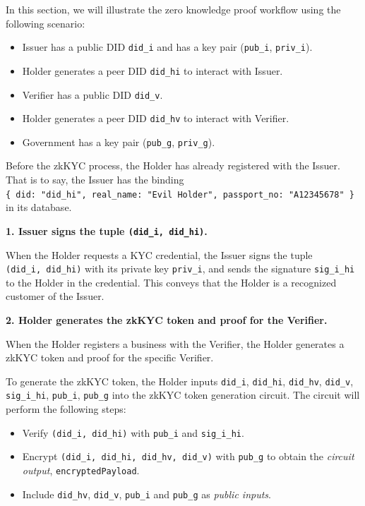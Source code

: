 \documentclass[
]{report}
\providecommand{\tightlist}{%
  \setlength{\itemsep}{0pt}\setlength{\parskip}{0pt}}
\begin{document}
In this section, we will illustrate the zero knowledge proof workflow
using the following scenario:

\begin{itemize}
\tightlist
\item
  Issuer has a public DID \texttt{did\_i} and has a key pair
  (\texttt{pub\_i}, \texttt{priv\_i}).
\item
  Holder generates a peer DID \texttt{did\_hi} to interact with Issuer.
\item
  Verifier has a public DID \texttt{did\_v}.
\item
  Holder generates a peer DID \texttt{did\_hv} to interact with
  Verifier.
\item
  Government has a key pair (\texttt{pub\_g}, \texttt{priv\_g}).
\end{itemize}

Before the zkKYC process, the Holder has already registered with the
Issuer. That is to say, the Issuer has the binding
\texttt{\{\ did:\ "did\_hi",\ real\_name:\ "Evil\ Holder",\ passport\_no:\ "A12345678"\ \}}
in its database.

\textbf{1. Issuer signs the tuple \texttt{(did\_i,\ did\_hi)}.}

When the Holder requests a KYC credential, the Issuer signs the tuple
\texttt{(did\_i,\ did\_hi)} with its private key \texttt{priv\_i}, and
sends the signature \texttt{sig\_i\_hi} to the Holder in the credential.
This conveys that the Holder is a recognized customer of the Issuer.

\textbf{2. Holder generates the zkKYC token and proof for the Verifier.}

When the Holder registers a business with the Verifier, the Holder
generates a zkKYC token and proof for the specific Verifier.

To generate the zkKYC token, the Holder inputs \texttt{did\_i},
\texttt{did\_hi}, \texttt{did\_hv}, \texttt{did\_v},
\texttt{sig\_i\_hi}, \texttt{pub\_i}, \texttt{pub\_g} into the zkKYC
token generation circuit. The circuit will perform the following
steps:

\begin{itemize}
\tightlist
\item
  Verify \texttt{(did\_i,\ did\_hi)} with \texttt{pub\_i} and
  \texttt{sig\_i\_hi}.
\item
  Encrypt \texttt{(did\_i,\ did\_hi,\ did\_hv,\ did\_v)} with
  \texttt{pub\_g} to obtain the \emph{circuit output},
  \texttt{encryptedPayload}.
\item
  Include \texttt{did\_hv}, \texttt{did\_v}, \texttt{pub\_i} and
  \texttt{pub\_g} as \emph{public inputs}.
\end{itemize}
\end{document}
